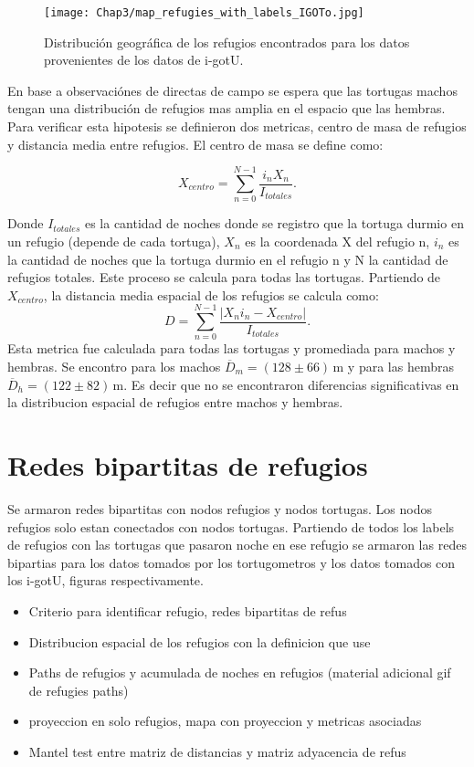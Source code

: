 \begin{figure}[ht]
    \begin{center}
        \texttt{[image: Chap3/map\_refugies\_with\_labels\_IGOTo.jpg]}
        \caption{Distribución geográfica de los refugios encontrados para los datos provenientes de los datos de i-gotU.} 
        \label{fig:refus_igotu_labels}
        
        \end{center}
\end{figure} 

En base a observaciónes de directas de campo \cite{Erika} se espera que las tortugas machos tengan una distribución de refugios mas amplia en el espacio que las hembras.  Para verificar esta hipotesis se definieron dos metricas, centro de masa de refugios y distancia media entre refugios. El centro de masa se define como:
\begin{center}
    

$$X_{centro}= \sum^{N -1}_{n=0} \frac{i_{n} X_n}{I_{totales}}.$$
\end{center}
Donde $I_{totales}$ es la cantidad de noches donde se registro que la tortuga durmio en un refugio (depende de cada tortuga), $X_n$ es la coordenada X del refugio n, $i_{n}$ es la cantidad de noches que la tortuga durmio en el refugio n y N la cantidad de refugios totales.  Este proceso se calcula para todas las tortugas. 
Partiendo de $X_{centro}$, la distancia media  espacial de los refugios se calcula como:
$$D = \sum^{N -1}_{n=0} \frac{|X_n i_n - X_{centro}|}{I_{totales}}.$$
\label{eq:distancia_media_refugios}
Esta metrica fue calculada para todas las tortugas y  promediada para  machos y hembras. Se encontro para los machos $\overline{D}_m =  (128\pm66)\,\text{m}$ y para las hembras     $\overline{D}_h = (122\pm82)\,\text{m}$. Es decir que no se encontraron diferencias significativas en la distribucion espacial de refugios  entre machos y hembras.
\section{Redes bipartitas de refugios}
Se armaron redes bipartitas con nodos refugios y nodos tortugas. Los nodos refugios solo estan conectados con nodos tortugas.  Partiendo de todos los labels de refugios con las tortugas que pasaron noche en ese refugio se armaron las redes bipartias para los datos tomados por los tortugometros y los datos tomados con los i-gotU, figuras respectivamente.%


\begin{itemize}
    \item Criterio para identificar refugio, redes bipartitas de refus
    \item Distribucion espacial de los refugios con la definicion que use
    \item Paths de refugios y acumulada de noches en refugios (material adicional gif de refugies paths)
    \item proyeccion en solo refugios, mapa con proyeccion y metricas asociadas 
    \item Mantel test entre matriz de distancias y matriz adyacencia de refus 
\end{itemize}
